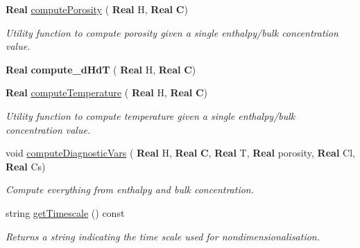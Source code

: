 \begin{DoxyCompactItemize}
\mbox{\label{class_mushy_layer_params_a91a19d85efeb430336443b7a3ec41fa3}} 
\textbf{ Real} \hyperlink{class_mushy_layer_params_a91a19d85efeb430336443b7a3ec41fa3}{compute\+Porosity} (\textbf{ Real} H, \textbf{ Real} \textbf{ C})
\begin{DoxyCompactList}\small\item\em Utility function to compute porosity given a single enthalpy/bulk concentration value. \end{DoxyCompactList}\item 
\mbox{\label{class_mushy_layer_params_a87dc72784b3a76e63ab000bede1168fb}} 
\textbf{ Real} {\bfseries compute\+\_\+d\+HdT} (\textbf{ Real} H, \textbf{ Real} \textbf{ C})
\item 
\mbox{\label{class_mushy_layer_params_a1d2c91e6c12ef6f0571529895226e4ba}} 
\textbf{ Real} \hyperlink{class_mushy_layer_params_a1d2c91e6c12ef6f0571529895226e4ba}{compute\+Temperature} (\textbf{ Real} H, \textbf{ Real} \textbf{ C})
\begin{DoxyCompactList}\small\item\em Utility function to compute temperature given a single enthalpy/bulk concentration value. \end{DoxyCompactList}\item 
\mbox{\label{class_mushy_layer_params_acfabb7142e80ce08f6dc3ab2fd93589e}} 
void \hyperlink{class_mushy_layer_params_acfabb7142e80ce08f6dc3ab2fd93589e}{compute\+Diagnostic\+Vars} (\textbf{ Real} H, \textbf{ Real} \textbf{ C}, \textbf{ Real} T, \textbf{ Real} porosity, \textbf{ Real} Cl, \textbf{ Real} Cs)
\begin{DoxyCompactList}\small\item\em Compute everything from enthalpy and bulk concentration. \end{DoxyCompactList}\item 
\mbox{\label{class_mushy_layer_params_a8d57fc06f29cb82e69b0c8c6d89dd60c}} 
string \hyperlink{class_mushy_layer_params_a8d57fc06f29cb82e69b0c8c6d89dd60c}{get\+Timescale} () const
\begin{DoxyCompactList}\small\item\em Returns a string indicating the time scale used for nondimensionalisation. \end{DoxyCompactList}\item 

\end{DoxyCompactItemize}
